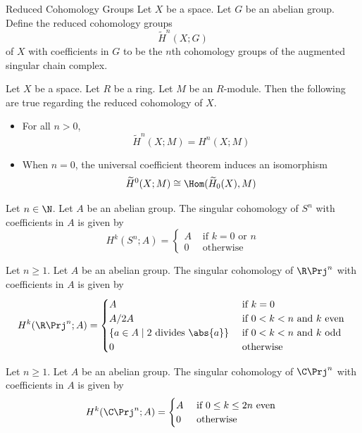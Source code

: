 \documentclass[a4paper]{article}
\begin{document}
\begin{defn}{Reduced Cohomology Groups}{} Let $X$ be a space. Let $G$ be an abelian group. Define the reduced cohomology groups $$\widetilde{H}^n(X;G)$$ of $X$ with coefficients in $G$ to be the $n$th cohomology groups of the augmented singular chain complex. 
\end{defn}

\begin{prp}{}{} Let $X$ be a space. Let $R$ be a ring. Let $M$ be an $R$-module. Then the following are true regarding the reduced cohomology of $X$. 
\begin{itemize}
\item For all $n>0$, $$\widetilde{H}^n(X;M)=H^n(X;M)$$
\item When $n=0$, the universal coefficient theorem induces an isomorphism $$\widetilde{H}^0(X;M)\cong\Hom(\widetilde{H}_0(X),M)$$
\end{itemize}
\end{prp}

\begin{eg}{}{} Let $n\in\N$. Let $A$ be an abelian group. The singular cohomology of $S^n$ with coefficients in $A$ is given by $$H^k(S^n;A)=\begin{cases}
A & \text{ if } k=0\text{ or }n\\
0 & \text{ otherwise }
\end{cases}$$
\end{eg}

\begin{eg}{}{} Let $n\geq 1$. Let $A$ be an abelian group. The singular cohomology of $\R\Prj^n$ with coefficients in $A$ is given by $$H^k(\R\Prj^n;A)=\begin{cases}
A & \text{ if } k=0\\
A/2A & \text{ if } 0<k<n\text{ and }k\text{ even }\\
\{a\in A\;|\;2\text{ divides }\abs{a}\} & \text{ if } 0<k<n\text{ and }k\text{ odd }\\
0 & \text{ otherwise }
\end{cases}$$
\end{eg}

\begin{eg}{}{} Let $n\geq 1$. Let $A$ be an abelian group. The singular cohomology of $\C\Prj^n$ with coefficients in $A$ is given by $$H^k(\C\Prj^n;A)=\begin{cases}
A & \text{ if } 0\leq k\leq 2n\text{ even }\\
0 & \text{ otherwise }
\end{cases}$$
\end{eg}
\end{document}
